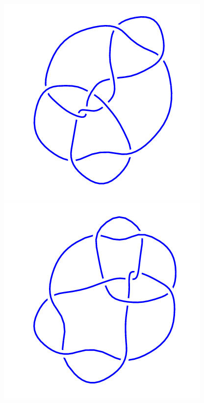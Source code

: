 \begin{figure}[H]
	\begin{minipage}[b]{.18\linewidth}
		\centering
		\includegraphics[width=\linewidth]{../data/10_92.png}
	\end{minipage}
	\begin{minipage}[b]{.18\linewidth}
		\centering
		\includegraphics[width=\linewidth]{../data/10_93.png}

\end{minipage}
\end{figure}
